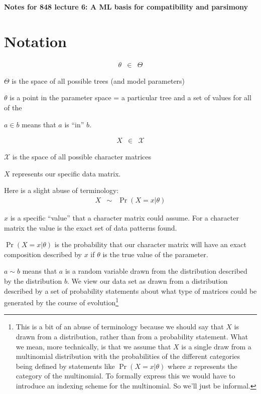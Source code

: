 \documentclass[11pt]{article}
\begin{document}
{\bf Notes for 848 lecture 6: A ML basis for compatibility and parsimony}
\section*{Notation}
\begin{eqnarray}
	\theta & \in & \Theta 
\end{eqnarray}
\begin{compactitem}
	\item $\Theta$ is the space of all possible trees (and model parameters)
	\item $\theta$ is a point in the parameter space = a particular tree and a set of values for all of the 			\item $a \in b$ means that $a$ is ``in'' $b$.
\end{compactitem}
\begin{eqnarray}
	X & \in & \mathcal{X} 
\end{eqnarray}
\begin{compactitem}
	\item $\mathcal{X}$ is the space of all possible character matrices
	\item $X$ represents our specific data matrix.
\end{compactitem}
Here is a slight abuse of terminology:
\begin{eqnarray}
	X & \sim & \Pr(X=x|\theta)
\end{eqnarray}
\begin{compactitem}
	\item $x$ is a specific ``value'' that a character matrix could assume.  For a character matrix
	the value is the exact set of data patterns found.
	\item $\Pr(X=x|\theta)$ is the probability that our character matrix will have an exact
	composition described by $x$ if $\theta$ is the true value of the parameter.
	\item $a \sim b$ means that $a$ is a random variable drawn from the distribution described by the distribution $b$.  
	We view our data set as drawn from a distribution described by a set of probability statements about what type of matrices could be generated by the course of evolution\footnote{This is a bit of an abuse of terminology because we should say that $X$ is drawn from a distribution, rather than from a probability statement.  
	What we mean, more technically, is that we assume that $X$ is a single draw from a multinomial distribution with the probabilities of the different categories being defined by statements like $\Pr(X=x|\theta)$ where $x$ represents the category of the multinomial.  To formally express this we would have to introduce an indexing scheme for the multinomial. So we'll just be informal.}
\end{compactitem}
\end{document}
